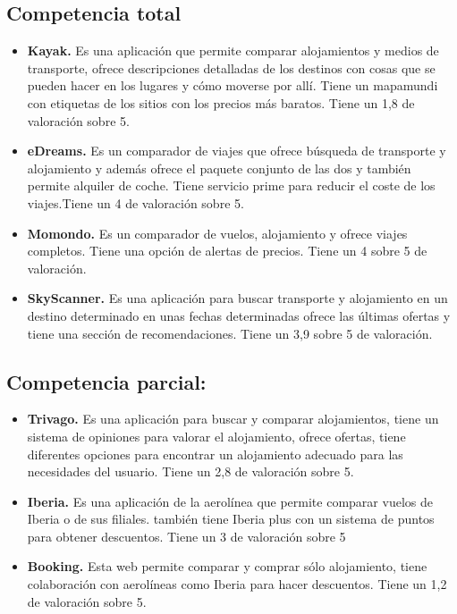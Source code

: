 \subsection{Competencia total}
\begin{itemize}
    \item\textbf{Kayak.} Es una aplicación que permite comparar alojamientos y medios de transporte, ofrece descripciones detalladas de los destinos con cosas que se pueden hacer en los lugares y cómo moverse por allí. Tiene un mapamundi con etiquetas de los sitios con los precios más baratos. Tiene un 1,8 de valoración sobre 5.
    \item\textbf{eDreams.} Es un comparador de viajes que ofrece búsqueda de transporte y alojamiento y además ofrece el paquete conjunto de las dos y también permite alquiler de coche. Tiene servicio prime para reducir el coste de los viajes.Tiene un 4 de valoración sobre 5.
    \item\textbf{Momondo.} Es un comparador de vuelos, alojamiento y ofrece viajes completos. Tiene una opción de alertas de precios. Tiene un 4 sobre 5 de valoración.
    \item\textbf{SkyScanner.} Es una aplicación para buscar transporte y alojamiento en un destino determinado en unas fechas determinadas ofrece las últimas ofertas y tiene una sección de recomendaciones. Tiene un 3,9 sobre 5 de valoración.
\end{itemize}

\subsection{Competencia parcial:}
\begin{itemize}
    \item\textbf{Trivago.} Es una aplicación para buscar y comparar alojamientos, tiene un sistema de opiniones para valorar el alojamiento, ofrece ofertas, tiene diferentes opciones para encontrar un alojamiento adecuado para las necesidades del usuario. Tiene un 2,8 de valoración sobre 5.
    \item\textbf{Iberia.} Es una aplicación de la aerolínea que permite comparar vuelos de Iberia o de sus filiales. también tiene Iberia plus con un sistema de puntos para obtener descuentos. Tiene un 3 de valoración sobre 5
    \item\textbf{Booking.} Esta web permite comparar y comprar sólo alojamiento, tiene colaboración con aerolíneas como Iberia para hacer descuentos. Tiene un 1,2 de valoración sobre 5.
\end{itemize}

